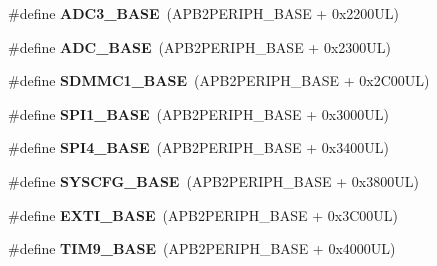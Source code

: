\begin{DoxyCompactItemize}
\mbox{\label{group___peripheral__memory__map_gaca766f86c8e0b00a8e2b0224dcbb4c82}} 
\#define {\bfseries A\+D\+C3\+\_\+\+B\+A\+SE}~(A\+P\+B2\+P\+E\+R\+I\+P\+H\+\_\+\+B\+A\+SE + 0x2200\+U\+L)
\item 
\mbox{\label{group___peripheral__memory__map_gad06cb9e5985bd216a376f26f22303cd6}} 
\#define {\bfseries A\+D\+C\+\_\+\+B\+A\+SE}~(A\+P\+B2\+P\+E\+R\+I\+P\+H\+\_\+\+B\+A\+SE + 0x2300\+U\+L)
\item 
\mbox{\label{group___peripheral__memory__map_ga8129623b8d7bc74a5f707729439590c4}} 
\#define {\bfseries S\+D\+M\+M\+C1\+\_\+\+B\+A\+SE}~(A\+P\+B2\+P\+E\+R\+I\+P\+H\+\_\+\+B\+A\+SE + 0x2\+C00\+U\+L)
\item 
\mbox{\label{group___peripheral__memory__map_ga50cd8b47929f18b05efbd0f41253bf8d}} 
\#define {\bfseries S\+P\+I1\+\_\+\+B\+A\+SE}~(A\+P\+B2\+P\+E\+R\+I\+P\+H\+\_\+\+B\+A\+SE + 0x3000\+U\+L)
\item 
\mbox{\label{group___peripheral__memory__map_gac5cfaedf263cee1e79554665f921c708}} 
\#define {\bfseries S\+P\+I4\+\_\+\+B\+A\+SE}~(A\+P\+B2\+P\+E\+R\+I\+P\+H\+\_\+\+B\+A\+SE + 0x3400\+U\+L)
\item 
\mbox{\label{group___peripheral__memory__map_ga62246020bf3b34b6a4d8d0e84ec79d3d}} 
\#define {\bfseries S\+Y\+S\+C\+F\+G\+\_\+\+B\+A\+SE}~(A\+P\+B2\+P\+E\+R\+I\+P\+H\+\_\+\+B\+A\+SE + 0x3800\+U\+L)
\item 
\mbox{\label{group___peripheral__memory__map_ga87371508b3bcdcd98cd1ec629be29061}} 
\#define {\bfseries E\+X\+T\+I\+\_\+\+B\+A\+SE}~(A\+P\+B2\+P\+E\+R\+I\+P\+H\+\_\+\+B\+A\+SE + 0x3\+C00\+U\+L)
\item 
\mbox{\label{group___peripheral__memory__map_ga92ae902be7902560939223dd765ece08}} 
\#define {\bfseries T\+I\+M9\+\_\+\+B\+A\+SE}~(A\+P\+B2\+P\+E\+R\+I\+P\+H\+\_\+\+B\+A\+SE + 0x4000\+U\+L)
\item 
\mbox{\label{group___peripheral__memory__map_ga3eff32f3801db31fb4b61d5618cad54a}} 

\end{DoxyCompactItemize}
